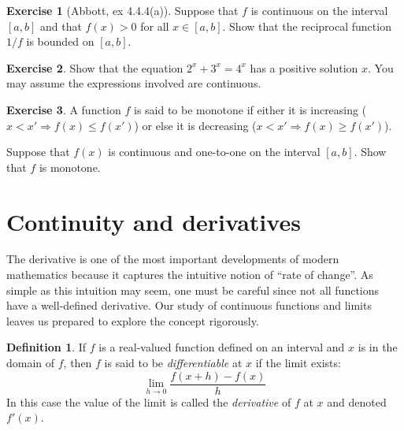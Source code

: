 \documentclass[11pt,oneside]{amsbook}
\newcommand{\N}{\mathbb N}
\theoremstyle{definition}
\newtheorem{exerc}{Exercise}[section]
\theoremstyle{plain}
\theoremstyle{definition}
\newtheorem{defn}[thm]{Definition}
\theoremstyle{remark}
\numberwithin{equation}{section}
\numberwithin{figure}{section}
\begin{document}

\begin{exerc}[Abbott, ex 4.4.4(a)]
  Suppose that $f$ is continuous on the interval $[a,b]$ and that $f(x)>0$ for all $x\in[a,b]$.  Show that the reciprocal function $1/f$ is bounded on $[a,b]$.
\end{exerc}

\begin{exerc}
  Show that the equation $2^x+3^x=4^x$ has a positive solution $x$. You may assume the expressions involved are continuous.
\end{exerc}

\begin{exerc}
  A function $f$ is said to be monotone if either it is increasing ($x<x'\Rightarrow f(x)\leq f(x')$) or else it is decreasing ($x<x'\Rightarrow f(x)\geq f(x')$).

  Suppose that $f(x)$ is continuous and one-to-one on the interval $[a,b]$. Show that $f$ is monotone.
\end{exerc}



\newpage
\section{Continuity and derivatives}

The derivative is one of the most important developments of modern mathematics because it captures the intuitive notion of ``rate of change''. As simple as this intuition may seem, one must be careful since not all functions have a well-defined derivative. Our study of continuous functions and limits leaves us prepared to explore the concept rigorously.

\begin{defn}
If $f$ is a real-valued function defined on an interval and $x$ is in the domain of $f$, then $f$ is said to be \emph{differentiable} at $x$ if the limit exists:
\[\lim_{h\to0}\frac{f(x+h)-f(x)}{h}
\]
In this case the value of the limit is called the \emph{derivative} of $f$ at $x$ and denoted $f'(x)$.
\end{defn}
\end{document}
